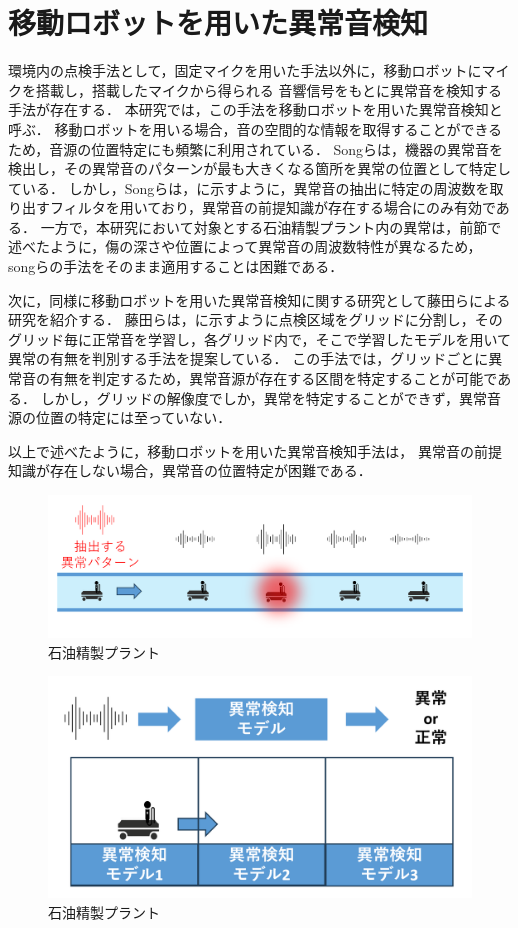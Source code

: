 \documentclass[../main]{subfiles}
\begin{document}
\section{移動ロボットを用いた異常音検知}
\label{sec:related_work_mobile}

環境内の点検手法として，固定マイクを用いた手法以外に，移動ロボットにマイクを搭載し，搭載したマイクから得られる
音響信号をもとに異常音を検知する手法が存在する．
本研究では，この手法を移動ロボットを用いた異常音検知と呼ぶ．
移動ロボットを用いる場合，音の空間的な情報を取得することができるため，音源の位置特定にも頻繁に利用されている．
Songらは，機器の異常音を検出し，その異常音のパターンが最も大きくなる箇所を異常の位置として特定している．
しかし，Songらは，に示すように，異常音の抽出に特定の周波数を取り出すフィルタを用いており，異常音の前提知識が存在する場合にのみ有効である．
一方で，本研究において対象とする石油精製プラント内の異常は，前節で述べたように，傷の深さや位置によって異常音の周波数特性が異なるため，
songらの手法をそのまま適用することは困難である．

次に，同様に移動ロボットを用いた異常音検知に関する研究として藤田らによる研究を紹介する．
藤田らは，に示すように点検区域をグリッドに分割し，そのグリッド毎に正常音を学習し，各グリッド内で，そこで学習したモデルを用いて異常の有無を判別する手法を提案している．
この手法では，グリッドごとに異常音の有無を判定するため，異常音源が存在する区間を特定することが可能である．
しかし，グリッドの解像度でしか，異常を特定することができず，異常音源の位置の特定には至っていない．

以上で述べたように，移動ロボットを用いた異常音検知手法は，
異常音の前提知識が存在しない場合，異常音の位置特定が困難である．

\begin{figure}[t]
  \centering
  \includegraphics[keepaspectratio, width=1.0\linewidth]{chap2/supervised_prev_research.png}
  \caption{石油精製プラント}
  \label{fig:supervised_prev_research}
\end{figure}

\begin{figure}[t]
  \centering
  \includegraphics[keepaspectratio, width=1.0\linewidth]{chap2/fujita_previous_research.png}
  \caption{石油精製プラント}
  \label{fig:fujita_previous_research}
\end{figure}
\end{document}
